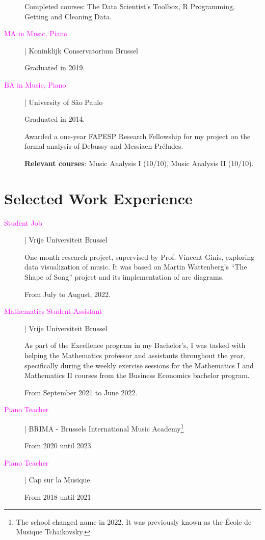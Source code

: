 \documentclass[12pt]{article}
\newcommand{\mycolor}{Fuchsia}
\newcommand{\thesectionicon}{}
\newcommand{\sectionicon}[1]{\renewcommand{\thesectionicon}{#1}}
\begin{document}
\begin{description}
  
Completed courses: The Data Scientist’s Toolbox, R Programming, Getting and Cleaning Data.  

\item[\textcolor{\mycolor}{MA in Music, Piano}] | Koninklijk Conservatorium Brussel

Graduated in 2019.

\item[\textcolor{\mycolor}{BA in Music, Piano}] | University of São Paulo

Graduated in 2014.

Awarded a one-year FAPESP Research Fellowship for my project on the formal analysis of Debussy and Messiaen Préludes.

\textbf{Relevant courses}: Music Analysis I (10/10), Music Analysis II (10/10).

\end{description}

\sectionicon{\faToolbox}
\section{Selected Work Experience}
\begin{description} 
\item[\textcolor{\mycolor}{Student Job}] | Vrije Universiteit Brussel

One-month research project, supervised by Prof. Vincent Ginis, exploring data visualization of music. It was based on Martin Wattenberg’s “The Shape of Song” project and its implementation of arc diagrams.
  
From July to August, 2022.

\item[\textcolor{\mycolor}{Mathematics Student-Assistant}] | Vrije Universiteit Brussel

As part of the Excellence program in my Bachelor’s, I was tasked with helping the Mathematics professor and assistants throughout the year, specifically during the weekly exercise sessions for the Mathematics I and Mathematics II courses from the Business Economics bachelor program.

From September 2021 to June 2022.

\item[\textcolor{\mycolor}{Piano Teacher}] | BRIMA - Brussels International Music Academy\footnote{The school changed name in 2022. It was previously known as the École de Musique Tchaikovsky.}
  
From 2020 until 2023.

\item[\textcolor{\mycolor}{Piano Teacher}] | Cap sur la Musique

From 2018 until 2021

\end{description}
\end{document}

